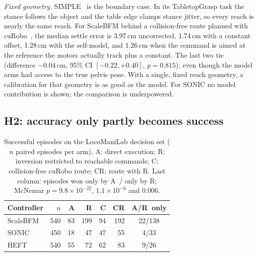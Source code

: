 \documentclass[conference]{IEEEtran}
\newcommand{\Ad}{\textsc{A}}   %
\newcommand{\Rr}{\textsc{R}}   %
\newcommand{\Croute}{\textsc{C}}   %
\newcommand{\CRr}{\textsc{CR}}   %
\begin{document}
\emph{Fixed geometry.} SIMPLE~\cite{simple} is the boundary case. In its TabletopGrasp task the stance follows the object and the table edge clamps stance jitter, so every reach is nearly the same reach. For ScaleBFM behind a collision-free route planned with cuRobo~\cite{curobo}, the median settle error is 3.97\,cm uncorrected, 1.74\,cm with a constant offset, 1.28\,cm with the self-model, and 1.26\,cm when the command is aimed at the reference the motors actually track plus a constant. The last two tie (difference $-0.04$\,cm, 95\% CI $[-0.22,+0.40]$, $p=0.815$), even though the model arms had access to the true pelvis pose. With a single, fixed reach geometry, a calibration for that geometry is as good as the model. For SONIC no model contribution is shown; the comparison is underpowered.

\subsection{H2: accuracy only partly becomes success}
\begin{table}[t]
\centering
\caption{Successful episodes on the LocoManiLab decision set ($n$ paired episodes per arm). \Ad: direct execution; \Rr: inversion restricted to reachable commands; \Croute: collision-free cuRobo route; \CRr: route with \Rr. Last column: episodes won only by \Ad\ / only by \Rr; McNemar $p=9.8\times10^{-22}$, $1.1\times10^{-6}$ and $0.006$.}
\label{tab:lml}
\begin{tabular}{lrrrrrc}
\toprule
Controller & $n$ & \Ad & \Rr & \Croute & \CRr & \Ad/\Rr\ only \\
\midrule
ScaleBFM & 540 & 83 & 199 & 94 & 192 & 22/138 \\
SONIC    & 450 & 18 & 47 & 47 & 55 & 4/33 \\
HEFT     & 540 & 55 & 72 & 62 & 83 & 9/26 \\
\bottomrule
\end{tabular}
\end{table}
\end{document}
